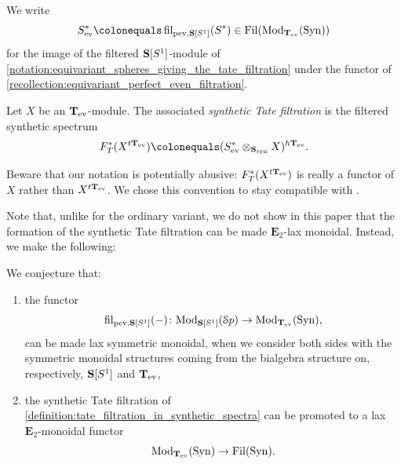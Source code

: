 \documentclass[oneside,a4paper]{amsart}
\begin{document}
\begin{notation}
\label{notation:filtered_synthetic_spectrum_inducing_the_equivariant_even_filtration}
We write 
\[
S^{\ast}_{\ev} \colonequals \fil_{\pev, \thesphere[S^{1}]}(S^{\ast}) \in \Fil(\Mod_{\evencircle}(\synspectra))
\]
for the image of the filtered $\mathbf{S}[S^{1}]$-module of \cref{notation:equivariant_spheres_giving_the_tate_filtration} under the functor of \cref{recollection:equivariant_perfect_even_filtration}.
\end{notation}

\begin{definition}
\label{definition:tate_filtration_in_synthetic_spectra}
Let $X$ be an $\mathbf{T}_{\mathrm{ev}}$-module. The associated \emph{synthetic Tate filtration} is the filtered synthetic spectrum
\[
F^{\ast}_{T}(X^{t \evencircle}) \colonequals (S^{\ast}_{\ev} \otimes_{\synsphere} X)^{h \evencircle}. 
\]
\end{definition}

\begin{warning}
Beware that our notation is potentially abusive: $F_{T}^{\ast}(X^{t \mathbf{T}_{\mathrm{ev}}})$ is really a functor of $X$ rather than $X^{t \mathbf{T}_{\mathrm{ev}}}$. We chose this convention to stay compatible with \cite[{\S 6.1}]{bhatt-lurie:apc}. 
\end{warning}

Note that, unlike for the ordinary variant, we do not show in this paper that the formation of the synthetic Tate filtration can be made $\mathbf{E}_{2}$-lax monoidal. Instead, we make the following:

\begin{conjecture}
\label{conjecture:monoidality_of_the_synthetic_tate_filtration}
We conjecture that: 
\begin{enumerate}
    \item the functor 
    \[
    \operatorname{fil}_{\mathrm{pev}, \mathbf{S}[S^{1}]}(-) \colon \mathrm{Mod}_{\mathbf{S}[S^{1}]}(\EuScript{S}p) \rightarrow \mathrm{Mod}_{\mathbf{T}_{\mathrm{ev}}}(\mathrm{Syn}), 
    \]
    can be made lax symmetric monoidal, when we consider both sides with the symmetric monoidal structures coming from the bialgebra structure on, respectively, $\mathbf{S}[S^{1}]$ and $\mathbf{T}_{\mathrm{ev}}$, 
    \item the synthetic Tate filtration of \cref{definition:tate_filtration_in_synthetic_spectra} can be promoted to a lax $\mathbf{E}_{2}$-monoidal functor
    \[
    \mathrm{Mod}_{\mathbf{T}_{\mathrm{ev}}}(\mathrm{Syn}) \rightarrow \operatorname{Fil}(\mathrm{Syn}).
    \] 
\end{enumerate}
\end{conjecture}
\end{document}
